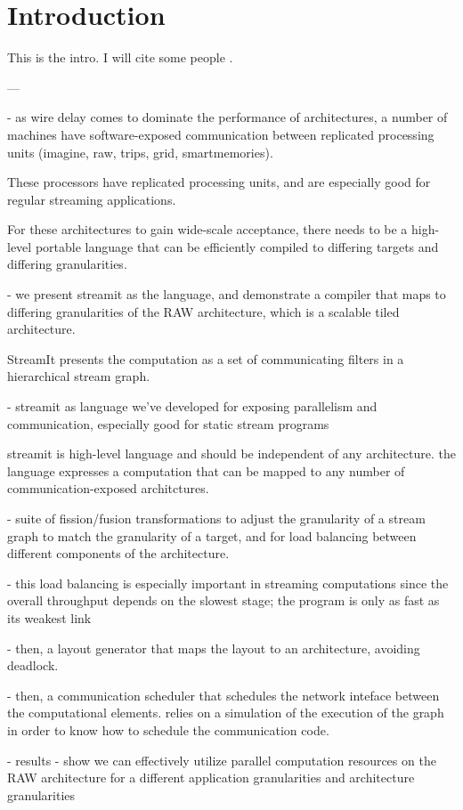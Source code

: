 \section{Introduction}

This is the intro.  I will cite some people \cite{pca}.

---

- as wire delay comes to dominate the performance of architectures, a
	number of machines have software-exposed communication between
	replicated processing units (imagine, raw, trips, grid,
	smartmemories).  

These processors have replicated processing units, and are
especially good for regular streaming applications.

For these architectures to gain wide-scale acceptance, there needs to
be a high-level portable language that can be efficiently compiled to
differing targets and differing granularities.

- we present streamit as the language, and demonstrate a compiler that
	maps to differing granularities of the RAW architecture, which
	is a scalable tiled architecture.  

StreamIt presents the computation as a set of communicating filters in
a hierarchical stream graph.

- streamit as language we've developed for exposing parallelism and
	communication, especially good for static stream programs

	streamit is high-level language and should be independent of
	any architecture.  the language expresses a computation that
	can be mapped to any number of communication-exposed architctures.

- suite of fission/fusion transformations to adjust the granularity of
	a stream graph to match the granularity of a target, and for
	load balancing between different components of the architecture.

- this load balancing is especially important in streaming
	computations since the overall throughput depends on the
	slowest stage; the program is only as fast as its weakest link

- then, a layout generator that maps the layout to an architecture,
	avoiding deadlock.

- then, a communication scheduler that schedules the network inteface
	between the computational elements.  relies on a simulation of
	the execution of the graph in order to know how to schedule
	the communication code.

- results - show we can effectively utilize parallel computation
	resources on the RAW architecture for a different application
	granularities and architecture granularities
